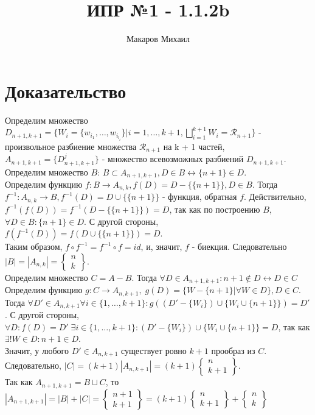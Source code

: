\documentclass{article}
\title{ИПР №1 - 1.1.2b}
\author{Макаров Михаил}
\date{}
\begin{document}
	\maketitle

	\section{Доказательство}
	Определим множество $ D_{n + 1, k + 1} = \{ W_i = \{ w_{i_1}, \ldots, w_{i_{l_i}} \} | i = 1, \ldots, k + 1,
	\bigsqcup_{i=1}^{k + 1} W_i = \mathcal{R}_{n + 1} \} $ - произвольное
	разбиение множества $\mathcal{R}_{n + 1}$ на k + 1 частей, $A_{n + 1, k + 1} = \{ D^j_{n + 1, k + 1} \} $ - 
	множество всевозможных разбиений $D_{n + 1, k + 1}$.\\
    Определим множество $B$: $B \subset A_{n + 1, k + 1}, D \in B \leftrightarrow \{ n + 1 \} \in D$.\\
    Определим функцию $f: B \rightarrow A_{n, k}, f(D) = D - \{ \{ n + 1 \} \}, D \in B$.
    Тогда $f^{-1}: A_{n, k} \rightarrow B, f^{-1}(D) = D \cup \{ \{n + 1\} \} $ - функция, обратная $f$.
    Действительно, $ f^{-1}(f(D)) = f^{-1}(D - \{ \{ n + 1 \} \}) = D$, так как по построению $B$,
    $ \forall D \in B: \{ n + 1 \} \in D$. С другой стороны, $f(f^{-1}(D)) = f(D \cup \{ \{n + 1\} \}) = D$.\\
    Таким образом, $f \circ f^{-1} = f^{-1} \circ f = id$, и, значит, $f$ - биекция. Следовательно
    $|B| = |A_{n, k}| = \left\{ \substack{n \\ k} \right\} $.\\
    Определим множество $C = A - B$. Тогда $ \forall D \in A_{n + 1, k + 1}: {n + 1} \notin D \leftrightarrow D \in C$ \\
    Определим функцию $g: C \rightarrow A_{n, k + 1},\; g(D) = \{W - \{n + 1\}| \forall W \in D\}, D \in C $.\\
    Тогда $\forall D' \in A_{n, k + 1} \forall i \in \{1, \ldots, k + 1\}:
     g((D' - \{ W_i \}) \cup \{ W_i \cup \{n + 1\} \}) = D'$. С другой стороны, \\
    $\forall D: f(D) = D' \; \exists i \in \{1, \ldots, k + 1\}: (D' - \{ W_i \}) \cup \{ W_i \cup \{n + 1\} \} = D$,
    так как $\exists! W \in D: n + 1 \in D$.\\
    Значит, у любого $D' \in A_{n, k + 1}$ существует ровно $k + 1$ прообраз из $C$. Следовательно, 
    $ |C| = (k + 1)|A_{n, k + 1}| = (k + 1) \left\{ \substack{n \\ k + 1} \right\}$. \\
    Так как $ A_{n + 1, k + 1} = B \sqcup C$, то 
    $|A_{n + 1, k + 1}| = |B| + |C| = \left\{ \substack{n + 1 \\ k + 1} \right\} = 
    (k + 1) \left\{ \substack{n \\ k + 1} \right\} + \left\{ \substack{n \\ k} \right\}$
    
	
\end{document}
